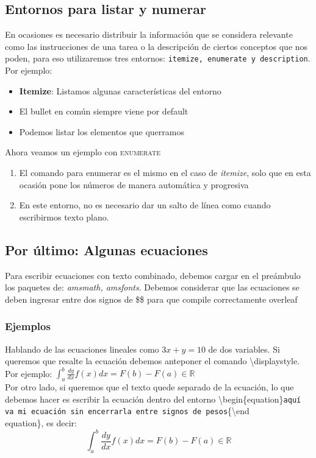 \documentclass{article}
\begin{document}
\subsection{Entornos para listar y numerar}
En ocasiones es necesario distribuir la información que se considera relevante como las instrucciones de una tarea o la descripción de ciertos conceptos que nos poden, para eso utilizaremos tres entornos: \texttt{itemize, enumerate y description}. Por ejemplo:
\begin{itemize}
    \item \textbf{Itemize}: Listamos algunas características del entorno
    \item El bullet en común siempre viene por default 
    \item  Podemos listar los elementos que querramos
\end{itemize}
Ahora veamos un ejemplo con \textsc{enumerate}%
\begin{enumerate}
    \item El comando para enumerar es el mismo en el caso de \textit{itemize}, solo que en esta ocasión pone los números de manera automática y progresiva
    \item En este entorno, no es necesario dar un salto de línea como cuando escribirmos texto plano.
\end{enumerate}
\subsection{Por último: Algunas ecuaciones}
Para escribir ecuaciones con texto combinado, debemos cargar en el preámbulo los paquetes de: \emph{amsmath, amsfonts}. Debemos considerar que las ecuaciones se deben ingresar entre dos signos de \$\$ para que compile correctamente overleaf%
\subsubsection{Ejemplos}
Hablando de las ecuaciones lineales como $3x+y=10$ de dos variables. Si queremos que resalte la ecuación debemos anteponer el comando {\textbackslash{displaystyle}}. Por ejemplo:  $\displaystyle \int_{a}^{b}\frac{dy}{dx}f(x)dx=F(b)-F(a)\in \mathbb{R}$\\
Por otro lado, si queremos que el texto quede separado de la ecuación, lo que debemos hacer es escribir la ecuación dentro del entorno {\textbackslash{begin\{equation\}\texttt{aquí va mi ecuación sin encerrarla entre signos de pesos}\{\textbackslash{end}\\{equation\}}}}, es decir:
\begin{equation}
    \int_{a}^{b}\frac{dy}{dx}f(x)dx=F(b)-F(a) \in \mathbb{R}
\end{equation}
\end{document}
